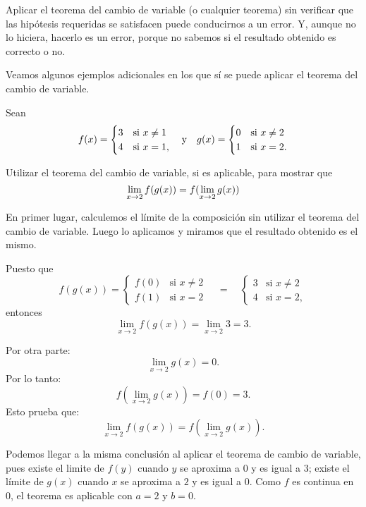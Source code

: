 Aplicar el teorema del cambio de variable (o cualquier teorema) sin verificar que las hipótesis
requeridas se satisfacen puede conducirnos a un error. Y, aunque no lo hiciera, hacerlo es un
error, porque no sabemos si el resultado obtenido es correcto o no.

Veamos algunos ejemplos adicionales en los que sí se puede aplicar el teorema del cambio de
variable.

\begin{exemplo}[Solución]{%
Sean
\begin{displaymath}
f(x)=
\begin{cases}
3 & \text{si $x\neq 1$}\\
4 & \text{si $x= 1$},
\end{cases} \yjc
g(x)=
\begin{cases}
0 & \text{si $x\neq 2$}\\
1 & \text{si $x= 2$}.
\end{cases}
\end{displaymath}

Utilizar el teorema del cambio de variable, si es aplicable, para mostrar que
\[
\limjc{f(g(x))}{x}{2} = f(\limjc{g(x)}{x}{2})
\]
}

En primer lugar, calculemos el límite de la composición sin utilizar el teorema del cambio de
variable. Luego lo aplicamos y miramos que el resultado obtenido es el mismo.

Puesto que
\[
f(g(x))=
\begin{cases}
f(0)&\text{si $x\neq 2$}\\
f(1) & \text{si $x= 2$}
\end{cases}
\quad =\quad
\begin{cases}
3 &\text{si $x\neq 2$}\\
4 & \text{si $x= 2$},
\end{cases}
\]
entonces
\[
\lim_{x\to 2}f(g(x))=\lim_{x\to 2}3=3.
\]

Por otra parte:
\[
\lim_{x\to 2}g(x)=0.
\]
Por lo tanto:
\[
f\left(\lim_{x\to 2}g(x)\right) = f(0) = 3.
\]
Esto prueba que:
\[
\lim_{x\to 2}f(g(x))= f\left( \lim_{x\to 2}g(x)  \right).
\]

Podemos llegar a la misma conclusión al aplicar el teorema de cambio de variable, pues existe el
limite de $f(y)$ cuando $y$ se aproxima a $0$ y es igual a $3$; existe el límite de $g(x)$ cuando
$x$ se aproxima a $2$ y es igual a $0$. Como $f$ es continua en $0$, el teorema es aplicable con $a
= 2$ y $b = 0$.
\end{exemplo}

